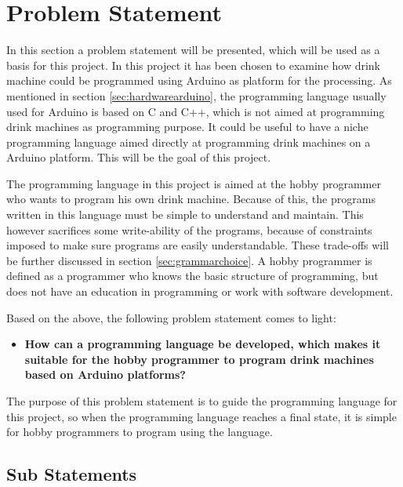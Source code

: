 \section{Problem Statement}
\label{sec:problemstatement}
In this section a problem statement will be presented, which will be used as a basis for this project. In this project it has been chosen to examine how drink machine could be programmed using Arduino as platform for the processing. As mentioned in section \ref{sec:hardwarearduino}, the programming language usually used for Arduino is based on C and C++, which is not aimed at programming drink machines as programming purpose. It could be useful to have a niche programming language aimed directly at programming drink machines on a Arduino platform. This will be the goal of this project.

The programming language in this project is aimed at the hobby programmer who wants to program his own drink machine. Because of this, the programs written in this language must be simple to understand and maintain. This however sacrifices some write-ability of the programs, because of constraints imposed to make sure programs are easily understandable. These trade-offs will be further discussed in section \ref{sec:grammarchoice}. A hobby programmer is defined as a programmer who knows the basic structure of programming, but does not have an education in programming or work with software development.

Based on the above, the following problem statement comes to light:
\begin{itemize}
	\item \textbf{How can a programming language be developed, which makes it suitable for the hobby programmer to program drink machines based on Arduino platforms?}
\end{itemize}
The purpose of this problem statement is to guide the programming language for this project, so when the programming language reaches a final state, it is simple for hobby programmers to program using the language. 

\subsection{Sub Statements}

